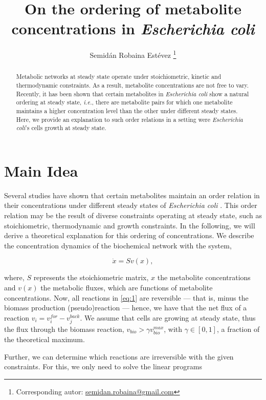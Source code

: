 \documentclass[12pt]{article}
\title{On the ordering of metabolite concentrations in \emph{Escherichia coli}}
\author{Semid\'an Robaina Est\'evez \footnote{Corresponding autor: \href{mailto:semidan.robaina@gmail.com}{semidan.robaina@gmail.com}}}
\affil{Ronin Institute for Independent Scholarship}
\date{\vspace{-5ex}}
\begin{document}
  \maketitle
  

  \begin{abstract}
    Metabolic networks at steady state operate under stoichiometric, kinetic and thermodynamic constraints. As a result, metabolite concentrations are not free to vary. Recently, it has been shown that certain metabolites in \emph{Escherichia coli} show a natural ordering at steady state, \emph{i.e.}, there are metabolite pairs for which one metabolite maintains a higher concentration level than the other under different steady states. Here, we provide an explanation to such order relations in a setting were \emph{Escherichia coli}'s cells growth at steady state.
  \end{abstract}

  \section{Main Idea}
  Several studies have shown that certain metabolites maintain an order relation in their concentrations under different steady states of \emph{Escherichia coli} \cite{Bennett2008}. This order relation may be the result of diverse constraints operating at steady state, such as stoichiometric, thermodynamic and growth constraints. In the following, we will derive a theoretical explanation for this ordering of concentrations. We describe the concentration dynamics of the biochemical network with the system,

  \begin{equation}
    \label{eq:1}
    \dot x = Sv(x),
  \end{equation}

  where, $S$ represents the stoichiometric matrix, $x$ the metabolite concentrations and $v(x)$ the metabolic fluxes, which are functions of metabolite concentrations. Now, all reactions in \ref{eq:1} are reversible --- that is, minus the biomass production (pseudo)reaction --- hence, we have that the net flux of a reaction $v_i = v_i^{for} - v_j^{back}$. We assume that cells are growing at steady state, thus the flux through the biomass reaction, $v_{bio} > \gamma v^{max}_{bio}$, with $\gamma \in [0, 1]$, a fraction of the theoretical maximum.

  Further, we can determine which reactions are irreversible with the given constraints. For this, we only need to solve the linear programs
\end{document}

